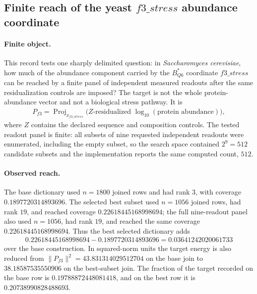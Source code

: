 
\subsection{Finite reach of the yeast $f3\_stress$ abundance coordinate}
\label{sec:biorality-q6-f3-stress-readout-reach}

\paragraph{Finite object.}
This record tests one sharply delimited question: in \emph{Saccharomyces cerevisiae}, how much of the abundance component carried by the $B^{*}_{Q6}$ coordinate $f3\_stress$ can be reached by a finite panel of independent measured readouts after the same residualization controls are imposed?  The target is not the whole protein-abundance vector and not a biological stress pathway.  It is
$$
\begin{aligned}
P_{f3} = \operatorname{Proj}_{x_{f3\_stress}}\bigl(Z\text{-residualized }\log_{10}(\text{protein abundance})\bigr),
\end{aligned}
$$
where $Z$ contains the declared sequence and composition controls.  The tested readout panel is finite: all subsets of nine requested independent readouts were enumerated, including the empty subset, so the search space contained $2^9=512$ candidate subsets and the implementation reports the same computed count, $512$.

\paragraph{Observed reach.}
The base dictionary used $n=1800$ joined rows and had rank $3$, with coverage $0.1897720314893696$.  The selected best subset used $n=1056$ joined rows, had rank $19$, and reached coverage $0.22618445168998694$; the full nine-readout panel also used $n=1056$, had rank $19$, and reached the same coverage $0.22618445168998694$.  Thus the best selected dictionary adds
$$
\begin{aligned}
0.22618445168998694 - 0.1897720314893696 = 0.03641242020061733
\end{aligned}
$$
over the base construction.  In squared-norm units the target energy is also reduced from $\|P_{f3}\|^2=43.831314029512704$ on the base join to $38.18587535550906$ on the best-subset join.  The fraction of the target recorded on the base row is $0.19788872448081418$, and on the best row it is $0.20738990828488693$.

